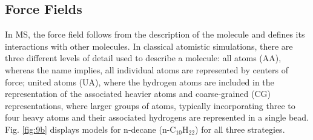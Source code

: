 \documentclass[9pt,bestpractices]{livecoms}
\begin{document}
\subsection{Force Fields}
\label{sec:forcefields}
In MS, the force field follows from the description of the molecule and defines
its interactions with other molecules. In classical atomistic simulations,
there are three different levels of detail used to describe a molecule: all
atoms (AA), whereas the name implies, all individual atoms are represented by
centers of force; united atoms (UA), where the hydrogen atoms are included in
the representation of the associated heavier atoms and coarse-grained (CG)
representations, where larger groups of atoms, typically incorporating three to
four heavy atoms and their associated hydrogens are represented in a single
bead. Fig. \ref{fig:9b} displays models for n-decane (n-C$_{10}$H$_{22}$) for all three strategies.
\end{document}
